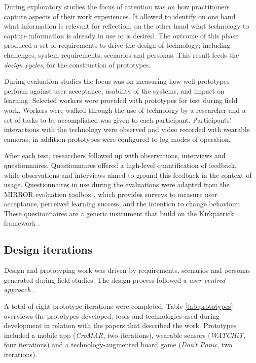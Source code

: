 During exploratory studies the focus of attention was on how practitioners capture aspects of their work experiences. It allowed to identify on one hand what information is relevant for reflection; on the other hand what technology to capture information is already in use or is desired. The outcome of this phase produced a set of requirements to drive the design of technology; including challenges, system requirements, scenarios and personas. This result feeds the \emph{design cycles}, for the construction of prototypes.

During evaluation studies the focus was on measuring how well prototypes perform against user acceptance, usability of the systems, and impact on learning. Selected workers were provided with prototypes for test during field work. Workers were walked through the use of technology by a researcher and a set of tasks to be accomplished was given to each participant. Participants' interactions with the technology were observed and video recorded with wearable cameras; in addition prototypes were configured to log modes of operation.

After each test, researchers followed up with observations, interviews and questionnaires. Questionnaires offered a high-level quantification of feedback, while observations and interviews aimed to ground this feedback in the context of usage. Questionnaires in use during the evaluations were adapted from the MIRROR evaluation toolbox \autocite{Knipfer:2012vi}, which provides surveys to measure user acceptance, perceived learning success, and the intention to change behaviour. These questionnaires are a generic instrument that build on the Kirkpatrick framework \autocite{kirkpatrick2009evaluating}. 

\subsection{Design iterations}\label{prototypes}

Design and prototyping work was driven by requirements, scenarios and personas generated during field studies. The design process followed a \emph{user centred approach} \autocites{MAGUIRE:2001dp}{Gulliksen:2003hd}.

A total of eight prototype iterations were completed. Table \ref{tab:prototypes} overviews the prototypes developed, tools and technologies used during development in relation with the papers that described the work. Prototypes included a mobile app (\emph{CroMAR}, two iterations), wearable sensors (\emph{WATCHiT}, four iterations) and a technology-augmented board game (\emph{Don't Panic}, two iterations). 

